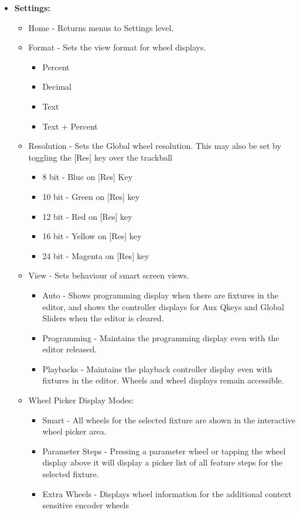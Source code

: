 \documentclass[
]{article}
\begin{document}
\begin{itemize}
\item
  \textbf{Settings:}

  \begin{itemize}
  \item
    Home - Returns menus to Settings level.
  \item
    Format - Sets the view format for wheel displays.

    \begin{itemize}
    \item
      Percent
    \item
      Decimal
    \item
      Text
    \item
      Text + Percent
    \end{itemize}
  \item
    Resolution - Sets the Global wheel resolution. This may also be set by toggling the {[}Res{]} key over the trackball

    \begin{itemize}
    \item
      8 bit - Blue on {[}Res{]} Key
    \item
      10 bit - Green on {[}Res{]} key
    \item
      12 bit - Red on {[}Res{]} key
    \item
      16 bit - Yellow on {[}Res{]} key
    \item
      24 bit - Magenta on {[}Res{]} key
    \end{itemize}
  \item
    View - Sets behaviour of smart screen views.

    \begin{itemize}
    \item
      Auto - Shows programming display when there are fixtures in the editor, and shows the controller displays for Aux Qkeys and Global Sliders when the editor is cleared.
    \item
      Programming - Maintains the programming display even with the editor released.
    \item
      Playbacks - Maintains the playback controller display even with fixtures in the editor. Wheels and wheel displays remain accessible.
    \end{itemize}
  \item
    Wheel Picker Display Modes:

    \begin{itemize}
    \item
      Smart - All wheels for the selected fixture are shown in the interactive wheel picker area.
    \item
      Parameter Steps - Pressing a parameter wheel or tapping the wheel display above it will display a picker list of all feature steps for the selected fixture.
    \item
      Extra Wheels - Displays wheel information for the additional context sensitive encoder wheels
    \end{itemize}
  \end{itemize}
\end{itemize}
\end{document}
